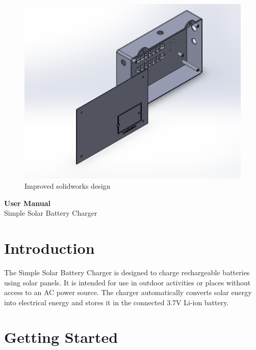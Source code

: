 \documentclass[twocolumn]{article}
\begin{document}
\begin{figure}[h]
\begin{minipage}[b]{0.2\textwidth}
\end{minipage}
\begin{minipage}[b]{0.2\textwidth}
\includegraphics[width=\textwidth]{10.png}
\end{minipage}
\caption{Improved solidworks design}
\end{figure}

\begin{titlepage}
    \centering
    \vspace*{\fill}
    \Huge\textbf{User Manual}\\
    \LARGE Simple Solar Battery Charger\\
    \vspace*{\fill}
\end{titlepage}

\tableofcontents

\newpage

\section{Introduction}
The Simple Solar Battery Charger is designed to charge rechargeable batteries using solar panels. It is intended for use in outdoor activities or places without access to an AC power source. The charger automatically converts solar energy into electrical energy and stores it in the connected 3.7V Li-ion battery.

\section{Getting Started}
\end{document}
